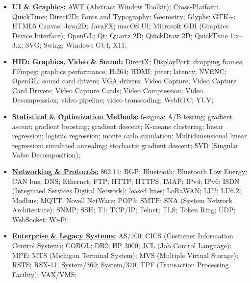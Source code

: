 \documentclass[letterpaper,11pt]{article}
\begin{document}
\begin{multicols}{3}
{\begin{itemize}[leftmargin=0.1in, label={}, itemsep=0pt, parsep=0pt, topsep=0pt, partopsep=0pt]
\item
    \textbf{\uline{UI \& Graphics:}} \hspace{0pt}
    AWT (Abstract Window Toolkit);
    Cross-Platform QuickTime;
    Direct2D;
    Fonts and Typography;
    Geometry;
    Glyphs;
    GTK+;
    HTML5 Canvas;
    Java2D;
    JavaFX;
    macOS UI;
    Microsoft GDI (Graphics Device Interface);
    OpenGL;
    Qt;
    Quartz 2D;
    QuickDraw 2D;
    QuickTime 1.x--3.x;
    SVG;
    Swing;
    Windows GUI;
    X11;
\item
    \textbf{\uline{HID: Graphics, Video \& Sound:}} \hspace{0pt}
    DirectX;
    DisplayPort;
    dropping frames;
    FFmpeg;
    graphics performance;
    H.264;
    HDMI;
    jitter;
    latency;
    NVENC;
    OpenGL;
    sound card drivers;
    VGA drivers;
    Video Capture;
    Video Capture Card Drivers;
    Video Capture Cards;
    Video Compression;
    Video Decompression;
    video pipeline;
    video transcoding;
    WebRTC;
    YUV;
\item
    \textbf{\uline{Statistical \& Optimization Methods:}} \hspace{0pt}
    6-sigma;
    A/B testing;
    gradient ascent;
    gradient boosting;
    gradient descent;
    K-means clustering;
    linear regression;
    logistic regression;
    monte carlo simulation;
    Multidimensional linear regression;
    simulated annealing;
    stochastic gradient descent;
    SVD (Singular Value Decomposition);
\item
    \textbf{\uline{Networking \& Protocols:}} \hspace{0pt}
    802.11;
    BGP;
    Bluetooth;
    Bluetooth Low Energy;
    CAN bus;
    DNS;
    Ethernet;
    FTP;
    HTTP;
    HTTPS;
    IMAP;
    IPv4;
    IPv6;
    ISDN (Integrated Services Digital Network);
    leased lines;
    LoRaWAN;
    LU2;
    LU6.2;
    Modbus;
    MQTT;
    Novell NetWare;
    POP3;
    SMTP;
    SNA (System Network Architecture);
    SNMP;
    SSH;
    T1;
    TCP/IP;
    Telnet;
    TLS;
    Token Ring;
    UDP;
    WebSocket;
    Wi-Fi;

\item
    \textbf{\uline{Enterprise \& Legacy Systems:}} \hspace{0pt}
    AS/400;
    CICS (Customer Information Control System);
    COBOL;
    DB2;
    HP 3000;
    JCL (Job Control Language);
    MPE;
    MTS (Michigan Terminal System);
    MVS (Multiple Virtual Storage);
    RSTS;
    RSX-11;
    System/360;
    System/370;
    TPF (Transaction Processing Facility);
    VAX/VMS;


\end{itemize}}
\end{multicols}
\end{document}
